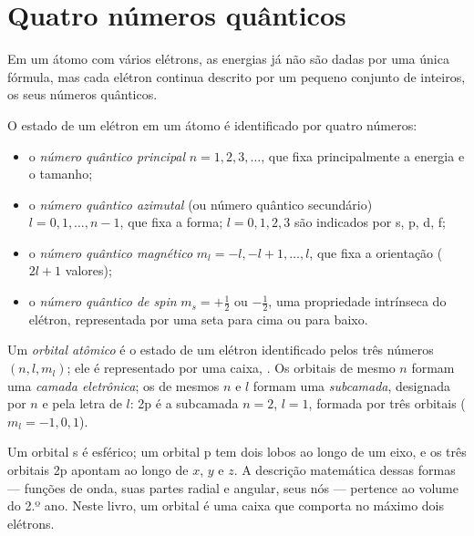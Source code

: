 \section{Quatro números quânticos}

Em um átomo com vários elétrons, as energias já não são dadas por uma
única fórmula, mas cada elétron continua descrito por um pequeno
conjunto de inteiros, os seus números quânticos.

\begin{definition}\label{def:b1:quantum-numbers:quantum-number}
O estado de um elétron em um átomo é identificado por quatro números:
\begin{itemize}
  \item o \emph{número quântico principal}
        $n = 1, 2, 3, \dots$, que fixa principalmente a energia e o tamanho;
  \item o \emph{número quântico azimutal}
        (ou número quântico secundário) $l = 0, 1, \dots, n-1$, que fixa
        a forma; $l = 0, 1, 2, 3$ são indicados por s, p, d, f;
  \item o \emph{número quântico magnético}
        $m_l = -l, -l+1, \dots, l$, que fixa a orientação ($2l + 1$
        valores);
  \item o \emph{número quântico de spin}
        $m_s = +\tfrac12$ ou $-\tfrac12$, uma propriedade intrínseca do
        elétron, representada por uma seta para cima ou para baixo.
\end{itemize}
\end{definition}

\begin{definition}\label{def:b1:quantum-numbers:orbital}
Um \emph{orbital atômico} é o estado de um elétron
identificado pelos três números $(n, l, m_l)$; ele é representado por uma
caixa, \omorbs{}. Os orbitais de mesmo $n$ formam uma \emph{camada
eletrônica}; os de mesmos $n$ e $l$ formam uma
\emph{subcamada}, designada por $n$ e pela letra de $l$:
2p é a subcamada $n = 2$, $l = 1$, formada por três orbitais
($m_l = -1, 0, 1$).
\end{definition}

\begin{remark}[Formas]\label{rem:b1:quantum-numbers:shapes}
Um orbital s é esférico; um orbital p tem dois lobos ao longo de um eixo,
e os três orbitais 2p apontam ao longo de $x$, $y$ e $z$. A descrição
matemática dessas formas --- funções de onda, suas partes radial e
angular, seus nós --- pertence ao volume do 2.º ano. Neste livro, um
orbital é uma caixa que comporta no máximo dois elétrons.
\end{remark}

